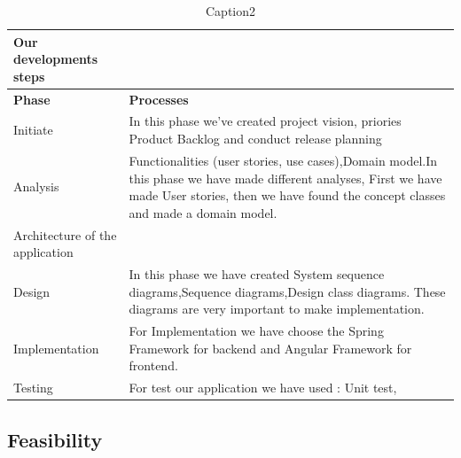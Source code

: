\documentclass{scrartcl}
\begin{document}
\begin{table}[h]
\begin{center}
\begin{tabular}{| p{7cm}| p{7cm} |}
Our developments steps \\
\hline
\textbf{Phase} & \textbf{Processes} \\
\hline
Initiate                    &             In this phase we've created project vision, priories Product Backlog and conduct release planning \\ \hline
Analysis                    &             Functionalities (user stories, use cases),Domain model.In this phase we have made different analyses, First we have made User stories, then we have found the concept classes and made a domain model.\\ \hline
Architecture of the application                   &           \\ \hline
Design                   &        In this phase we have created  System sequence diagrams,Sequence diagrams,Design class diagrams. These diagrams are very important to make implementation. \\ \hline
Implementation                   &           For Implementation we have choose the Spring Framework for backend and Angular Framework for frontend.\\ \hline
Testing                   &            For test our application we have used : Unit test,  \\ \hline
\end{tabular}
\end{center}
\caption{Caption2}
\label{table2}
\end{table}

\subsection{Feasibility}
\end{document}
